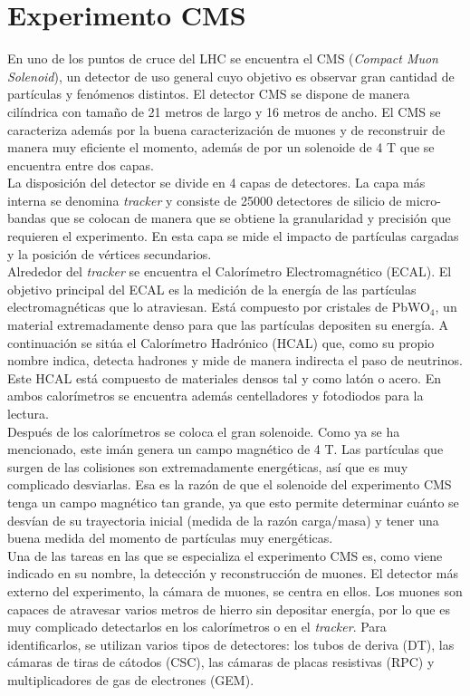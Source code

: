 \section{Experimento CMS}

En uno de los puntos de cruce del LHC se encuentra el CMS (\textit{Compact Muon Solenoid}), un detector de uso general cuyo objetivo es observar gran cantidad de partículas y fenómenos distintos. El detector CMS se dispone de manera cilíndrica con tamaño de 21 metros de largo y 16 metros de ancho. El CMS se caracteriza además por la buena caracterización de muones y de reconstruir de manera muy eficiente el momento, además de por un solenoide de 4 T que se encuentra entre dos capas.\\

La disposición del detector se divide en 4 capas de detectores. La capa más interna se denomina \textit{tracker} y consiste de 25000 detectores de silicio de micro-bandas que se colocan de manera que se obtiene la granularidad y precisión que requieren el experimento. En esta capa se mide el impacto de partículas cargadas y la posición de vértices secundarios.\\

Alrededor del \textit{tracker} se encuentra el Calorímetro Electromagnético (ECAL). El objetivo principal del ECAL es la medición de la energía de las partículas electromagnéticas que lo atraviesan. Está compuesto por cristales de PbWO$_4$, un material extremadamente denso para que las partículas depositen su energía. A continuación se sitúa el Calorímetro Hadrónico (HCAL) que, como su propio nombre indica, detecta hadrones y mide de manera indirecta el paso de neutrinos. Este HCAL está compuesto de materiales densos tal y como latón o acero. En ambos calorímetros se encuentra además centelladores y fotodiodos para la lectura.\\

Después de los calorímetros se coloca el gran solenoide. Como ya se ha mencionado, este imán genera un campo magnético de 4 T. Las partículas que surgen de las colisiones son extremadamente energéticas, así que es muy complicado desviarlas. Esa es la razón de que el solenoide del experimento CMS tenga un campo magnético tan grande, ya que esto permite determinar cuánto se desvían de su trayectoria inicial (medida de la razón carga/masa) y tener una buena medida del momento de partículas muy energéticas.\\

Una de las tareas en las que se especializa el experimento CMS es, como viene indicado en su nombre, la detección y reconstrucción de muones. El detector más externo del experimento, la cámara de muones, se centra en ellos. Los muones son capaces de atravesar varios metros de hierro sin depositar energía, por lo que es muy complicado detectarlos en los calorímetros o en el \textit{tracker}. Para identificarlos, se utilizan varios tipos de detectores: los tubos de deriva (DT), las cámaras de tiras de cátodos (CSC), las cámaras de placas resistivas (RPC) y multiplicadores de gas de electrones (GEM).

